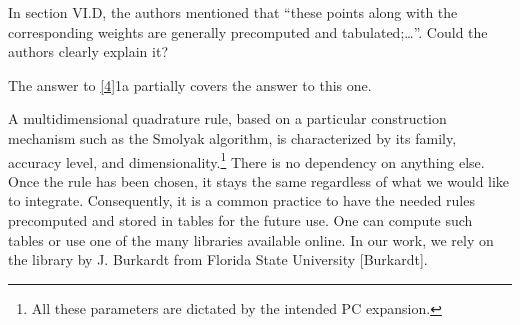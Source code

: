 \begin{reviewer}
In section VI.D, the authors mentioned that ``these points along with the corresponding weights are generally precomputed and tabulated;\ldots''. Could the authors clearly explain it?
\end{reviewer}
\begin{authors}
The answer to \cref{4}{1a} partially covers the answer to this one.

A multidimensional quadrature rule, based on a particular construction mechanism such as the Smolyak algorithm, is characterized by its family, accuracy level, and dimensionality.\footnote{All these parameters are dictated by the intended PC expansion.}
There is no dependency on anything else.
Once the rule has been chosen, it stays the same regardless of what we would like to integrate.
Consequently, it is a common practice to have the needed rules precomputed and stored in tables for the future use.
One can compute such tables or use one of the many libraries available online.
In our work, we rely on the library by J. Burkardt from Florida State University [Burkardt].

\begin{actions}
\end{actions}
\end{authors}

